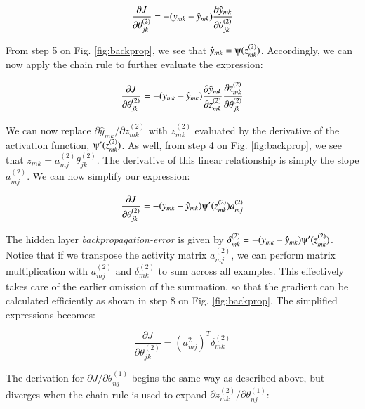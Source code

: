 \begin{equation*}
    \frac{\partial J}{\partial \theta_{jk}^{(2)}} =  -(y_{mk} - \hat{y}_{mk})\frac{\partial \hat{y}_{mk}}{\partial \theta_{jk}^{(2)}}\\
\end{equation*}

\noindent
From step 5 on Fig. \ref{fig:backprop}, we see that $\hat{y}_{mk} = \psiup(z_{mk}^{(2)})$. Accordingly, we can now apply the chain rule to further evaluate the expression: 

\begin{equation*}
    \frac{\partial J}{\partial \theta_{jk}^{(2)}} =  -(y_{mk} - \hat{y}_{mk}) \frac{\partial \hat{y}_{mk}}{\partial z_{mk}^{(2)}} \frac{\partial z_{mk}^{(2)}}{\partial \theta_{jk}^{(2)}}\\
\end{equation*}

\noindent
We can now replace $\partial \hat{y}_{mk} / \partial z_{mk}^{(2)}$ with $z_{mk}^{(2)}$ evaluated by the derivative of the activation function, $\psiup'(z_{mk}^{(2)})$. As well, from step 4 on Fig. \ref{fig:backprop}, we see that $z_{mk} = a_{mj}^{(2)}\theta_{jk}^{(2)}$. The derivative of this linear relationship is simply the slope $a_{mj}^{(2)}$. We can now simplify our expression:

\begin{equation*}
    \frac{\partial J}{\partial \theta_{jk}^{(2)}} =  -(y_{mk} - \hat{y}_{mk}) \psiup'(z_{mk}^{(2)}) a_{mj}^{(2)}
\end{equation*}

\noindent
The hidden layer \textit{backpropagation-error} is given by $\delta_{mk}^{(2)} = -(y_{mk} - \hat{y}_{mk})\psiup'(z_{mk}^{(2)})$. Notice that if we transpose the activity matrix $a_{mj}^{(2)}$, we can perform matrix multiplication with $a_{mj}^{(2)}$ and $\delta_{mk}^{(2)}$ to sum across all examples. This effectively takes care of the earlier omission of the summation, so that the gradient can be calculated efficiently as shown in step 8 on Fig. \ref{fig:backprop}. The simplified expressions becomes:

\begin{equation*}
    \frac{\partial J}{\partial \theta_{jk}^{(2)}} =  (a_{mj}^{2})^{T}\delta_{mk}^{(2)}
\end{equation*}

\noindent
The derivation for $\partial J / \partial \theta_{nj}^{(1)}$ begins the same way as described above, but diverges when the chain rule is used to expand $\partial z_{mk}^{(2)}/\partial \theta_{nj}^{(1)}$:
 
